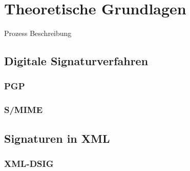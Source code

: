 \chapter{Theoretische Grundlagen}
\label{chp:TheoretischeGrundlagen}

Prozess Beschreibung


\section{Digitale Signaturverfahren}
\label{sec:thg:dsv}


\subsection{PGP}
\label{sec:thg:dsv:pgp}

\subsection{S/MIME}
\label{sec:thg:dsv:smime}


\section{Signaturen in XML}
\label{sec:thg:xml}


\subsection{XML-DSIG}
\label{sec:thg:xml:dsig}
